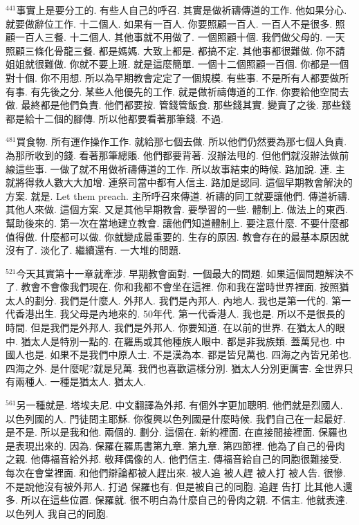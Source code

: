 \documentclass{book}
\begin{document}
$^{441}$事實上是要分工的.
有些人自己的呼召.
其實是做祈禱傳道的工作.
他如果分心.
就要做辭位工作.
十二個人.
如果有一百人.
你要照顧一百人.
一百人不是很多.
照顧一百人三餐.
十二個人.
其他事就不用做了.
一個照顧十個.
我們做父母的.
一天照顧三條化骨龍三餐.
都是媽媽.
大致上都是.
都搞不定.
其他事都很難做.
你不請姐姐就很難做.
你就不要上班.
就是這麼簡單.
一個十二個照顧一百個.
你都是一個對十個.
你不用想.
所以為早期教會定定了一個規模.
有些事.
不是所有人都要做所有事.
有先後之分.
某些人他優先的工作.
就是做祈禱傳道的工作.
你要給他空間去做.
最終都是他們負責.
他們都要按.
管錢管飯食.
那些錢其實.
變賣了之後.
那些錢都是給十二個的腳傳.
所以他都要看著那筆錢.
不過.

$^{481}$買食物.
所有運作操作工作.
就給那七個去做.
所以他們仍然要為那七個人負責.
為那所收到的錢.
看著那筆總賬.
他們都要背著.
沒辦法甩的.
但他們就沒辦法做前線這些事.
一做了就不用做祈禱傳道的工作.
所以故事結束的時候.
路加說.
連.
主就將得救人數大大加增.
連祭司當中都有人信主.
路加是認同.
這個早期教會解決的方案.
就是.
Let them preach.
主所呼召來傳道.
祈禱的同工就要讓他們.
傳道祈禱.
其他人來做.
這個方案.
又是其他早期教會.
要學習的一些.
體制上.
做法上的東西.
幫助後來的.
第一次在當地建立教會.
讓他們知道體制上.
要注意什麼.
不要什麼都值得做.
什麼都可以做.
你就變成最重要的.
生存的原因.
教會存在的最基本原因就沒有了.
淡化了.
繼續還有.
一大堆的問題.

$^{521}$今天其實第十一章就牽涉.
早期教會面對.
一個最大的問題.
如果這個問題解決不了.
教會不會像我們現在.
你和我都不會坐在這裡.
你和我在當時世界裡面.
按照猶太人的劃分.
我們是什麼人.
外邦人.
我們是內邦人.
內地人.
我也是第一代的.
第一代香港出生.
我父母是內地來的.
50年代.
第一代香港人.
我也是.
所以不是很長的時間.
但是我們是外邦人.
我們是外邦人.
你要知道.
在以前的世界.
在猶太人的眼中.
猶太人是特別一點的.
在羅馬或其他種族人眼中.
都是非我族類.
蓋萬兒也.
中國人也是.
如果不是我們中原人士.
不是漢為本.
都是皆兒萬也.
四海之內皆兄弟也.
四海之外.
是什麼呢?就是兒萬.
我們也喜歡這樣分別.
猶太人分別更厲害.
全世界只有兩種人.
一種是猶太人.
猶太人.

$^{561}$另一種就是.
塔埃夫尼.
中文翻譯為外邦.
有個外字更加聰明.
他們就是烈國人.
以色列國的人.
門徒問主耶穌.
你復興以色列國是什麼時候.
我們自己在一起最好.
是不是.
所以是我和他.
兩個的.
劃分.
這個在.
新約裡面.
在直接間接裡面.
保羅也是表現出來的.
因為.
保羅在羅馬書第九章.
第九章.
第四節裡.
他為了自己的骨肉之親.
他傳福音給外邦.
敬拜偶像的人.
他們信主.
傳福音給自己的同胞很難接受.
每次在會堂裡面.
和他們辯論都被人趕出來.
被人追 被人趕 被人打 被人告.
很慘.
不是說他沒有被外邦人.
打過 保羅也有.
但是被自己的同胞.
追趕 告打 比其他人還多.
所以在這些位置.
保羅就.
很不明白為什麼自己的骨肉之親.
不信主.
他就表達.
以色列人 我自己的同胞.
\end{document}
